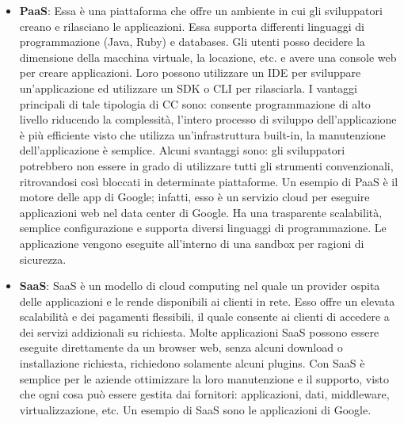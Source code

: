 \begin{itemize}
    \item \textbf{PaaS}: Essa è una piattaforma che offre un ambiente in cui gli sviluppatori creano e rilasciano le applicazioni. Essa supporta differenti linguaggi di programmazione (Java, Ruby) e databases. Gli utenti posso decidere la dimensione della macchina virtuale, la locazione, etc. e avere una console web per creare applicazioni. Loro possono utilizzare un IDE per sviluppare un'applicazione ed utilizzare un SDK o CLI per rilasciarla. I vantaggi principali di tale tipologia di CC sono: consente programmazione di alto livello riducendo la complessità, l'intero processo di sviluppo dell'applicazione è più efficiente visto che utilizza un'infrastruttura built-in, la manutenzione dell'applicazione è semplice. Alcuni svantaggi sono: gli sviluppatori potrebbero non essere in grado di utilizzare tutti gli strumenti convenzionali, ritrovandosi così bloccati in determinate piattaforme. Un esempio di PaaS è il motore delle app di Google; infatti, esso è un servizio cloud per eseguire applicazioni web nel data center di Google. Ha una trasparente scalabilità, semplice configurazione e supporta diversi linguaggi di programmazione. Le applicazione vengono eseguite all'interno di una sandbox per ragioni di sicurezza.
    \item \textbf{SaaS}: SaaS è un modello di cloud computing nel quale un provider ospita delle applicazioni e le rende disponibili ai clienti in rete. Esso offre un elevata scalabilità e dei pagamenti flessibili, il quale consente ai clienti di accedere a dei servizi addizionali su richiesta. Molte applicazioni SaaS possono essere eseguite direttamente da un browser web, senza alcuni download o installazione richiesta, richiedono solamente alcuni plugins. Con SaaS è semplice per le aziende ottimizzare la loro manutenzione e il supporto, visto che ogni cosa può essere gestita dai fornitori: applicazioni, dati, middleware, virtualizzazione, etc. Un esempio di SaaS sono le applicazioni di Google.
\end{itemize}
